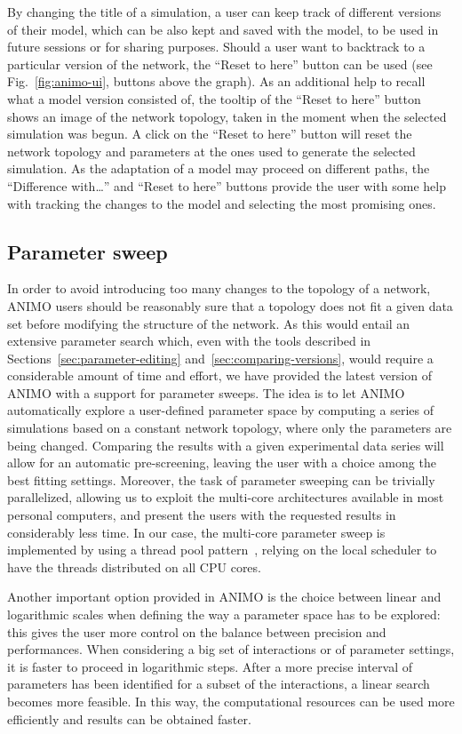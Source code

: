\documentclass[submission,copyright,creativecommons]{eptcs}
\begin{document}
By changing the title of a simulation, a user can keep track of different versions of their model,
which can be also kept and saved with the model, to be used in future sessions or for sharing purposes.
Should a user want to backtrack to a particular version of the network, the ``Reset to here'' button
can be used (see Fig.~\ref{fig:animo-ui}, buttons above the graph). As an additional help to recall what a model version consisted of, the tooltip of
the ``Reset to here'' button shows an image of the network topology, taken in the moment when
the selected simulation was begun. A click on the ``Reset to here'' button will reset the
network topology and parameters at the ones used to generate the selected simulation.
As the adaptation of a model may proceed on different paths, the ``Difference with\dots'' and
``Reset to here'' buttons provide the user with some help with tracking the changes to the model
and selecting the most promising ones.

\subsection{Parameter sweep}\label{sec:parameter-sweep}
In order to avoid introducing too many changes to the topology of a network, ANIMO users
should be reasonably sure that a topology does not fit a given data set before
modifying the structure of the network. As this would entail an extensive parameter search which,
even with the tools
described in Sections~\ref{sec:parameter-editing} and~\ref{sec:comparing-versions}, would
require a considerable amount of time and effort, we have provided the latest version of ANIMO
with a support for parameter sweeps. The idea is to let ANIMO automatically explore a user-defined parameter
space by computing a series of simulations based on a constant network topology, where only the
parameters are being changed. Comparing the results with a given experimental data series
will allow for an automatic pre-screening, leaving the user with a choice among the best
fitting settings.
Moreover, the task of parameter sweeping can be trivially parallelized, allowing us to
exploit the multi-core architectures available in most personal computers, and present the
users with the requested results in considerably less time.
In our case, the multi-core parameter sweep is implemented by using a thread pool pattern~\cite{thread-pool},
relying on the local scheduler to have the threads distributed on all CPU cores.

Another important option provided in ANIMO is the choice between linear and logarithmic scales
when defining the way a parameter space has to be explored: this gives the user more
control on the balance between precision and performances. When considering a big set of
interactions or of parameter settings, it is faster to proceed in logarithmic steps. After
a more precise interval of parameters has been identified for a subset of the interactions,
a linear search becomes more feasible. In this way, the computational resources can be used more efficiently
and results can be obtained faster.
\end{document}
